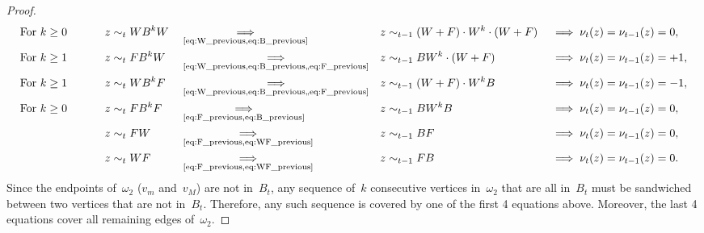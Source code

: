 \documentclass{article}
\newcommand{\impliesplus}[1]{\underset{\text{\Cref{#1}}}{\implies}}
\begin{document}
\begin{proof}
    \begin{alignat*}{5}
        &\text{For $k \geq 0$ \qquad} &&z \sim_t WB^kW &&\impliesplus{eq:W_previous,eq:B_previous} &&z \sim_{t-1} (W+F)\cdot W^k \cdot(W+F) &&\implies \nu_t(z) = \nu_{t-1}(z) = 0, \\
        &\text{For $k \geq 1$} &&z \sim_t FB^kW &&\impliesplus{eq:W_previous,eq:B_previous,,eq:F_previous} &&z \sim_{t-1} B W^k \cdot(W+F) &&\implies \nu_t(z) = \nu_{t-1}(z) = +1, \\
        &\text{For $k \geq 1$} &&z \sim_t WB^kF &&\impliesplus{eq:W_previous,eq:B_previous,,eq:F_previous} &&z \sim_{t-1} (W+F) \cdot W^k B &&\implies \nu_t(z) = \nu_{t-1}(z) = -1, \\
        & \text{For $k \geq 0$} &&z \sim_t FB^kF &&\impliesplus{eq:F_previous,eq:B_previous} &&z \sim_{t-1} BW^kB &&\implies \nu_t(z) = \nu_{t-1}(z) = 0, \\
        & &&z \sim_t FW &&\impliesplus{eq:F_previous,eq:WF_previous} &&z \sim_{t-1} BF &&\implies \nu_t(z) = \nu_{t-1}(z) = 0, \\
        & &&z \sim_t WF &&\impliesplus{eq:F_previous,eq:WF_previous} &&z \sim_{t-1} FB &&\implies \nu_t(z) = \nu_{t-1}(z) = 0. 
    \end{alignat*}
    Since the endpoints of~$\omega_2$ ($v_m$ and~$v_M$) are not in~$B_t$,
    any sequence of~$k$ consecutive vertices in~$\omega_2$ that are all in~$B_t$ must be sandwiched between two vertices that are not in~$B_t$.
    Therefore, any such sequence is covered by one of the first 4 equations above.
    Moreover, the last 4 equations cover all remaining edges of~$\omega_2$.
    

\end{proof}
\end{document}

